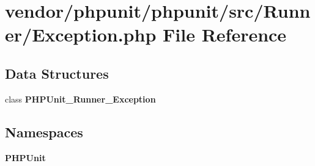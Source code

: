\section{vendor/phpunit/phpunit/src/\+Runner/\+Exception.php File Reference}
\label{phpunit_2phpunit_2src_2_runner_2_exception_8php}
\subsection*{Data Structures}
\begin{DoxyCompactItemize}
\item 
class {\bf P\+H\+P\+Unit\+\_\+\+Runner\+\_\+\+Exception}
\end{DoxyCompactItemize}
\subsection*{Namespaces}
\begin{DoxyCompactItemize}
\item 
 {\bf P\+H\+P\+Unit}
\end{DoxyCompactItemize}
